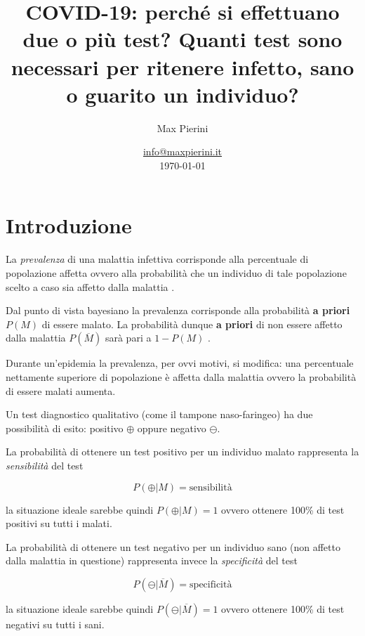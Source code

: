 \documentclass[11pt]{article}
\title{COVID-19: perché si effettuano due o più test? Quanti test sono necessari per ritenere infetto, sano o guarito un individuo?}
\author{Max Pierini}
\date{%
    \href{mailto:info@maxpierini.it}{info@maxpierini.it}\\%
    \today
}
\begin{document}
    
    \maketitle
    
    

    
    \hypertarget{introduzione}{%
\section{Introduzione}\label{introduzione}}

La \emph{prevalenza} di una malattia infettiva corrisponde alla
percentuale di popolazione affetta ovvero alla probabilità che un
individuo di tale popolazione scelto a caso sia affetto dalla malattia
\cite{porta2014dictionary}.

Dal punto di vista bayesiano la prevalenza corrisponde alla probabilità
\textbf{a priori} \(P(M)\) di essere malato. La probabilità dunque
\textbf{a priori} di non essere affetto dalla malattia
\(P(\overline{M})\) sarà pari a \(1 - P(M)\) \cite{kruschke2014doing}.

Durante un'epidemia la prevalenza, per ovvi motivi, si modifica: una
percentuale nettamente superiore di popolazione è affetta dalla malattia
ovvero la probabilità di essere malati aumenta.

Un test diagnostico qualitativo (come il tampone naso-faringeo) ha due
possibilità di esito: positivo \(\oplus\) oppure negativo \(\ominus\).

La probabilità di ottenere un test positivo per un individuo malato
rappresenta la \emph{sensibilità} del test \cite{porta2014dictionary}

\begin{equation}\label{eq:sens}
P(\oplus | M) = \textrm{sensibilità}
\end{equation}

la situazione ideale sarebbe quindi \(P(\oplus|M)=1\) ovvero ottenere
100\% di test positivi su tutti i malati.

La probabilità di ottenere un test negativo per un individuo sano (non
affetto dalla malattia in questione) rappresenta invece la
\emph{specificità} del test \cite{porta2014dictionary}

\begin{equation}\label{eq:spec}
P(\ominus | \overline{M}) = \textrm{specificità}
\end{equation}

la situazione ideale sarebbe quindi \(P(\ominus|\overline{M})=1\) ovvero
ottenere 100\% di test negativi su tutti i sani.
\end{document}
